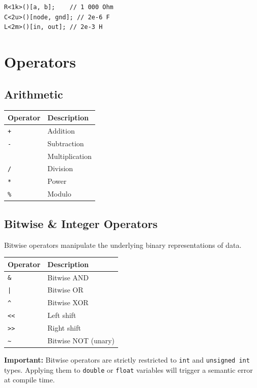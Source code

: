 \documentclass[11pt, a4paper]{article}
\newcommand{\code}[1]{\texttt{\small #1}}
\begin{document}
\begin{lstlisting}
R<1k>()[a, b];    // 1 000 Ohm
C<2u>()[node, gnd]; // 2e-6 F
L<2m>()[in, out]; // 2e-3 H
\end{lstlisting}

\section{Operators}

\subsection{Arithmetic}

\begin{center}
\begin{tabular}{@{} C{3cm} L{8cm} @{}}
  \toprule
  \textbf{Operator} & \textbf{Description} \\
  \midrule
  \code{+}  & Addition \\
  \code{-}  & Subtraction \\
  \code{*}  & Multiplication \\
  \code{/}  & Division \\
  \code{**} & Power \\
  \code{\%}  & Modulo \\
  \bottomrule
\end{tabular}
\end{center}

\subsection{Bitwise \& Integer Operators}

Bitwise operators manipulate the underlying binary representations of data.
\begin{center}
\begin{tabular}{@{} C{3cm} L{8cm} @{}}
  \toprule
  \textbf{Operator} & \textbf{Description} \\
  \midrule
  \code{\&}  & Bitwise AND \\
  \code{|}   & Bitwise OR \\
  \code{\textasciicircum}  & Bitwise XOR \\
  \code{<<}  & Left shift \\
  \code{>>}  & Right shift \\
  \code{\textasciitilde}   & Bitwise NOT (unary) \\
  \bottomrule
\end{tabular}
\end{center}
\textbf{Important:} Bitwise operators are strictly restricted to \code{int} and \code{unsigned int} types. Applying them to \code{double} or \code{float} variables will trigger a semantic error at compile time.
\end{document}
